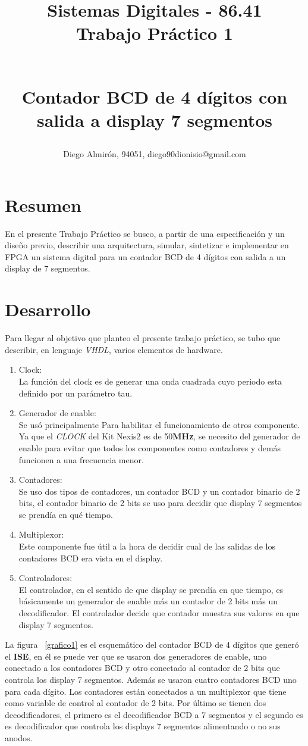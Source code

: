 \documentclass[10pt,a4paper]{article}
\author{Diego Almirón, 94051, diego90dionisio@gmail.com}
\title{
\begin{small}
Sistemas Digitales - 86.41 \\
Trabajo Práctico 1
\end{small}
\\ Contador BCD de 4 dígitos con salida a display 7 segmentos
}
\begin{document}
\maketitle
\section*{Resumen}
En el presente Trabajo Práctico se busco, a partir de una especificación y un 
diseño previo, describir una arquitectura, simular, sintetizar e implementar en
FPGA un sistema digital para un contador BCD de 4 dígitos con salida a un 
display de 7 segmentos. 
\section*{Desarrollo}
Para llegar al objetivo que planteo el presente trabajo práctico, se tubo que 
describir, en lenguaje \textit{VHDL}, varios elementos de hardware.
\begin{enumerate}
\item Clock: \\
La función del clock es de generar una onda cuadrada cuyo periodo esta definido 
por un parámetro tau.
\item Generador de enable: \\
Se usó principalmente Para habilitar el funcionamiento de otros componente. Ya 
que el \textit{CLOCK} del Kit Nexis2 es de 50\textbf{MHz}, se necesito del 
generador de enable para evitar que todos los componentes como contadores y 
demás funcionen a una frecuencia menor. 
\item Contadores: \\
Se uso dos tipos de contadores, un contador BCD y un contador binario de 2 
bits, el contador binario de 2 bits se uso para decidir que display 7 
segmentos se prendía en qué tiempo.
\item Multiplexor: \\
Este componente fue útil a la hora de decidir cual de las salidas de los 
contadores BCD era vista en el display.
\item Controladores: \\
El controlador, en el sentido de que display se prendía en que tiempo, 
es básicamente un generador de enable más un contador de 2 bits más un 
decodificador. El controlador decide que contador muestra sus valores 
en que display 7 segmentos.
\end{enumerate}

La figura ~\ref{grafico1} es el esquemático del contador BCD de 4 dígitos que 
generó el \textbf{ISE}, en él se puede ver que se usaron dos generadores de 
enable, uno conectado a los contadores BCD y otro conectado al contador de 2 
bits que controla los display 7 segmentos. Además se usaron cuatro contadores
BCD uno para cada dígito. Los contadores están conectados a un multiplexor que 
tiene como variable de control al contador de 2 bits. Por último se tienen dos 
decodificadores, el primero es el decodificador BCD a 7 segmentos y el segundo 
es es decodificador que controla los displays 7 segmentos alimentando o no sus 
anodos.
\end{document}

